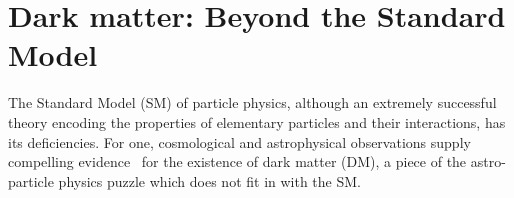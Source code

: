 \chapter{Dark matter: Beyond the Standard Model}
\label{chap:DM}



The Standard Model (SM) of particle physics, although an extremely successful theory encoding the properties of elementary particles and their interactions, has its deficiencies. For one, cosmological and astrophysical observations supply compelling evidence~\cite{Bertone:2004pz, Feng:2010gw, Porter:2011nv} for the existence of dark matter (DM), a piece of the astro-particle physics puzzle which does not fit in with the SM. 

